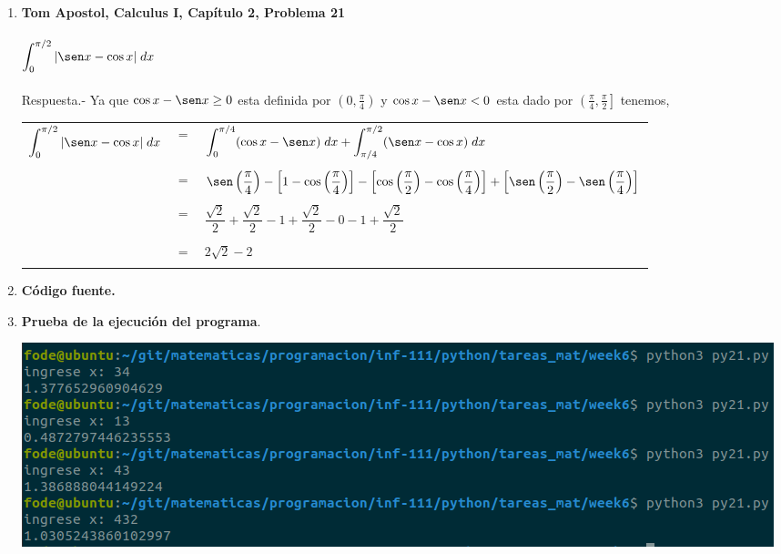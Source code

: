 \begin{enumerate}
\begin{enumerate}[\bfseries a)]
	\item \textbf{\large Tom Apostol, Calculus I, Capítulo 2, Problema 21}\\\\
	$\displaystyle\int_0^{\pi/2} |\sen x - \cos x|\; dx$\\\\
	Respuesta.-\; Ya que $\cos x - \sen x \geq 0$ esta definida por $\left(0,\frac{\pi}{4}\right)$ y $\cos x - \sen x < 0$ esta dado por $\left(\frac{\pi}{4},\frac{\pi}{2}\right]$ tenemos,
	\begin{center}
	    \begin{tabular}{rcl}
		$\displaystyle\int_0^{\pi/2} |\sen x - \cos x|\; dx$&$=$&$\displaystyle\int_0^{\pi/4}(\cos x - \sen x)\; dx + \int_{\pi/4}^{\pi/2}(\sen x - \cos x)\; dx$\\\\
								    &$=$&$\sen\left(\dfrac{\pi}{4}\right)-\left[1-\cos\left(\dfrac{\pi}{4}\right)\right]  -\left[\cos\left(\dfrac{\pi}{2}\right)-\cos\left(\dfrac{\pi}{4}\right)\right]+\left[\sen\left(\dfrac{\pi}{2}\right)-\sen \left(\dfrac{\pi}{4}\right)\right]$\\\\
								    &$=$&$\dfrac{\sqrt{2}}{2}+\dfrac{\sqrt{2}}{2}-1+\dfrac{\sqrt{2}}{2}-0-1+\dfrac{\sqrt{2}}{2}$\\\\
		  &$=$&$2\sqrt{2}-2$\\\\
	      \end{tabular}

	\end{center}

	\item \textbf{Código fuente.}\\ 
	    
	    
	    \vspace{.5cm}
	
	\item \textbf{Prueba de la ejecución del programa}.\\
	    \begin{center}
		\includegraphics[scale=.55]{imagenes/tareas_mat/week6/py21.png}
	    \end{center}


\end{enumerate}
\end{enumerate}
